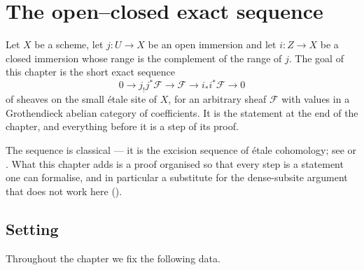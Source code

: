 
\chapter{The open--closed exact sequence}\label{chap:openclosed}

Let $X$ be a scheme, let $j\colon U\to X$ be an open immersion and let
$i\colon Z\to X$ be a closed immersion whose range is the complement of the
range of $j$.  The goal of this chapter is the short exact sequence
\[
  0\longrightarrow j_!j^*\mathcal F\longrightarrow\mathcal F
   \longrightarrow i_*i^*\mathcal F\longrightarrow0
\]
of sheaves on the small \'etale site of $X$, for an arbitrary sheaf
$\mathcal F$ with values in a Grothendieck abelian category of coefficients.
It is the statement  at the end of the chapter, and
everything before it is a step of its proof.

The sequence is classical --- it is the excision sequence of \'etale
cohomology; see \cite[II.3]{MilneEtale} or \cite{SGA4}.  What this chapter
adds is a proof organised so that every step is a statement one can formalise,
and in particular a substitute for the dense-subsite argument that does not
work here ().

\section{Setting}\label{sec:openclosed-setting}

Throughout the chapter we fix the following data.

